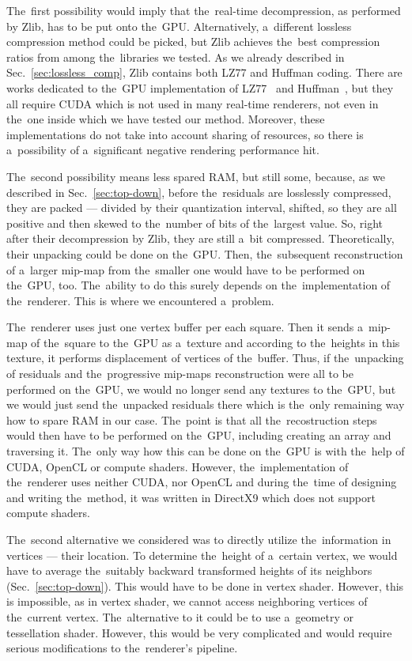 The~first possibility would imply that the~real-time decompression, as performed by Zlib, has to be put onto the~GPU. Alternatively, a~different lossless compression method could be picked, but Zlib achieves the~best compression ratios from among the~libraries we tested. As we already described in Sec.~\ref{sec:lossless_comp}, Zlib contains both LZ77 and Huffman coding. There are works dedicated to the~GPU implementation of LZ77~\cite{gpuLZ77Cuda1} and Huffman~\cite{gpuHuffman1, gpuHuffmanCuda1}, but they all require CUDA which is not used in many real-time renderers, not even in the~one inside which we have tested our method. Moreover, these implementations do not take into account sharing of resources, so there is a~possibility of a~significant negative rendering performance hit.

The~second possibility means less spared RAM, but still some, because, as we described in Sec.~\ref{sec:top-down}, before the~residuals are losslessly compressed, they are packed --- divided by their quantization interval, shifted, so they are all positive and then skewed to the~number of bits of the~largest value. So, right after their decompression by Zlib, they are still a~bit compressed. Theoretically, their unpacking could be done on the~GPU. Then, the~subsequent reconstruction of a~larger mip-map from the~smaller one would have to be performed on the~GPU, too. The~ability to do this surely depends on the~implementation of the~renderer. This is where we encountered a~problem.

The~renderer uses just one vertex buffer per each square. Then it sends a~mip-map of the~square to the~GPU as a~texture and according to the~heights in this texture, it performs displacement of vertices of the~buffer. Thus, if the~unpacking of residuals and the~progressive mip-maps reconstruction were all to be performed on the~GPU, we would no longer send any textures to the~GPU, but we would just send the~unpacked residuals there which is the~only remaining way how to spare RAM in our case. The~point is that all the~recostruction steps would then have to be performed on the~GPU, including creating an array and traversing it. The~only way how this can be done on the~GPU is with the~help of CUDA, OpenCL or compute shaders. However, the~implementation of the~renderer uses neither CUDA, nor OpenCL and during the~time of designing and writing the~method, it was written in DirectX9 which does not support compute shaders.  

The~second alternative we considered was to directly utilize the~information in vertices --- their location. To determine the~height of a~certain vertex, we would have to average the~suitably backward transformed heights of its neighbors (Sec.~\ref{sec:top-down}). This would have to be done in vertex shader. However, this is impossible, as in vertex shader, we cannot access neighboring vertices of the~current vertex. The~alternative to it could be to use a~geometry or tessellation shader. However, this would be very complicated and would require serious modifications to the~renderer's pipeline.

